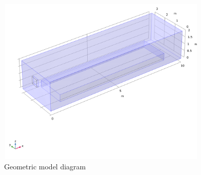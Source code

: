 \documentclass{apmcmthesis}
\begin{document}
\begin{figure}[htbp]
  \centering
  \includegraphics[width=10cm,height=8cm]{figures/Geometric model diagram.png}
  \caption{Geometric model diagram}
  \label{Geometric model diagram}
\end{figure}
\end{document}
